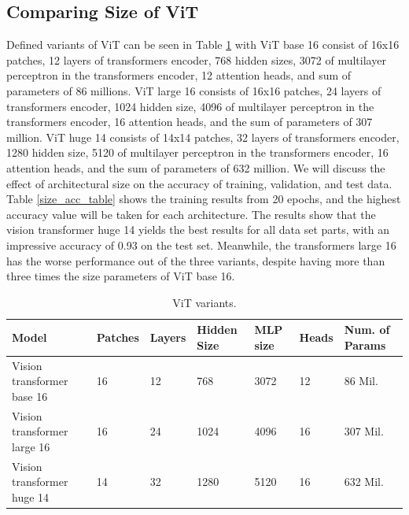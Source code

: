 \documentclass{article}
\begin{document}
\subsection{Comparing Size of ViT}
Defined variants of ViT can be seen in Table \ref{vit_variants} with ViT base 16 consist of 16x16 patches, 12 layers of transformers encoder, 768 hidden sizes, 3072 of multilayer perceptron in the transformers encoder, 12 attention heads, and sum of parameters of 86 millions. ViT large 16 consists of 16x16 patches, 24 layers of transformers encoder, 1024 hidden size, 4096 of multilayer perceptron in the transformers encoder, 16 attention heads, and the sum of parameters of 307 million. ViT huge 14 consists of 14x14 patches, 32 layers of transformers encoder, 1280 hidden size, 5120 of multilayer perceptron in the transformers encoder, 16 attention heads, and the sum of parameters of 632 million.
We will discuss the effect of architectural size on the accuracy of training, validation, and test data. Table \ref{size_acc_table} shows the training results from 20 epochs, and the highest accuracy value will be taken for each architecture. The results show that the vision transformer huge 14 yields the best results for all data set parts, with an impressive accuracy of 0.93 on the test set. Meanwhile, the transformers large 16 has the worse performance out of the three variants, despite having more than three times the size parameters of ViT base 16.



\begin{table}[!b]
	\caption{ViT variants.}
	\label{vit_variants}
	\centering
	\begin{tabular}{p{4cm}|p{1.2cm}p{1.2cm}p{1.2cm}p{1.2cm}p{1.2cm}p{1.2cm}}
		Model & Patches & Layers & Hidden Size & MLP size & Heads & Num. of Params \\
		\hline
		Vision transformer base 16 &
		16 &
		12 &
		768 &
		3072 &
		12 &
		86 Mil.\\
		Vision transformer large 16 &
		16 &
		24 &
		1024 &
		4096 &
		16 &
		307 Mil.\\
		Vision transformer huge 14 &
		14 &
		32 &
		1280 &
		5120 &
		16 &
		632 Mil.
	\end{tabular}
\end{table}
\end{document}
